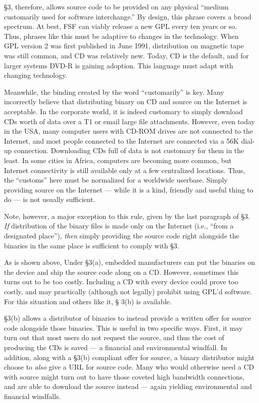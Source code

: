 \documentclass[11pt, letterpaper]{book}
\begin{document}
\S 3, therefore, allows source code to be provided on any physical
``medium customarily used for software interchange.''  By design, this
phrase covers a broad spectrum. At best, FSF can viably release a new GPL
every ten years or so. Thus, phrases like this must be adaptive to
changes in the technology. When GPL version 2 was first published in June
1991, distribution on magnetic tape was still common, and CD was
relatively new. Today, CD is the default, and for larger systems DVD-R is
gaining adoption. This language must adapt with changing technology.

Meanwhile, the binding created by the word ``customarily'' is key. Many
incorrectly believe that distributing binary on CD and source on the
Internet is acceptable. In the corporate world, it is indeed customary to
simply download CDs worth of data over a T1 or email large file
attachments. However, even today in the USA, many computer users with
CD-ROM drives are not connected to the Internet, and most people connected
to the Internet are connected via a 56K dial-up connection. Downloading
CDs full of data is not customary for them in the least. In some cities
in Africa, computers are becoming more common, but Internet connectivity
is still available only at a few centralized locations. Thus, the
``customs'' here must be normalized for a worldwide userbase. Simply
providing source on the Internet --- while it is a kind, friendly and
useful thing to do --- is not usually sufficient.

Note, however, a major exception to this rule, given by the last paragraph
of \S 3. \emph{If} distribution of the binary files is made only on the
Internet (i.e., ``from a designated place''), \emph{then} simply providing
the source code right alongside the binaries in the same place is
sufficient to comply with \S 3.

\medskip

As is shown above, Under \S 3(a), embedded manufacturers can put the
binaries on the device and ship the source code along on a CD\@. However,
sometimes this turns out to be too costly. Including a CD with every
device could prove too costly, and may practically (although not legally)
prohibit using GPL'd software. For this situation and others like it, \S
3(b) is available.

\S 3(b) allows a distributor of binaries to instead provide a written
offer for source code alongside those binaries. This is useful in two
specific ways. First, it may turn out that most users do not request the
source, and thus the cost of producing the CDs is saved --- a financial
and environmental windfall. In addition, along with a \S 3(b) compliant
offer for source, a binary distributor might choose to \emph{also} give a
URL for source code. Many who would otherwise need a CD with source might
turn out to have those coveted high bandwidth connections, and are able to
download the source instead --- again yielding environmental and financial
windfalls.
\end{document}
